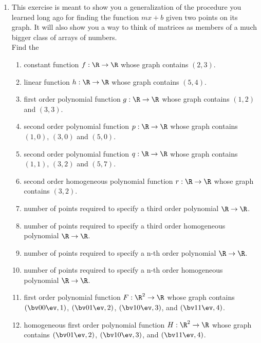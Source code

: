 \begin{enumerate}
\item This exercise is meant to show you a generalization of the procedure you learned long ago for finding the function $mx+b$  given two points on its graph. It will also show you a way to think of matrices as members of a much bigger class of arrays of numbers. \\

Find the
\begin{enumerate}
\item constant function $f:\R \to \R $ whose graph contains $(2,3)$.
\item linear function $h:\R \to \R$ whose graph contains $(5,4)$.
\item first order polynomial function $g:\R \to \R$ whose graph contains 
$(1,2)$ and $(3,3)$.
\item second order polynomial function $p:\R \to \R$ whose graph contains $(1,0)$, $(3,0)$ and $(5,0)$.
\item second order polynomial function $q:\R \to \R$ whose graph contains $(1,1)$, $(3,2)$ and $(5,7)$.
\item second order homogeneous polynomial function $r:\R \to \R$ whose graph contains $(3,2)$.\\
\item \label{3rdPoly} number of points required to specify a third order polynomial $\R\to \R$.
\item number of points required to specify a third order homogeneous polynomial $\R\to \R$.
\item number of points required to specify a n-th order polynomial $\R\to \R$.
\item number of points required to specify a n-th order homogeneous polynomial $\R\to \R$.\\
\item first order polynomial function $F:\R^2 \to \R $ whose graph contains 
$\left(  \bv 0\\0 \ev , 1\right)$, 
$\left(  \bv 0\\1 \ev , 2\right)$, 
$\left(  \bv 1\\0 \ev , 3\right)$,  and
$\left(  \bv 1\\1 \ev , 4\right)$.

\item homogeneous first order polynomial function $H:\R^2 \to \R $ whose graph contains 
$\left(  \bv 0\\1 \ev , 2\right)$, 
$\left(  \bv 1\\0 \ev , 3\right)$,  and
$\left(  \bv 1\\1 \ev , 4\right)$.


\end{enumerate}
\end{enumerate}
